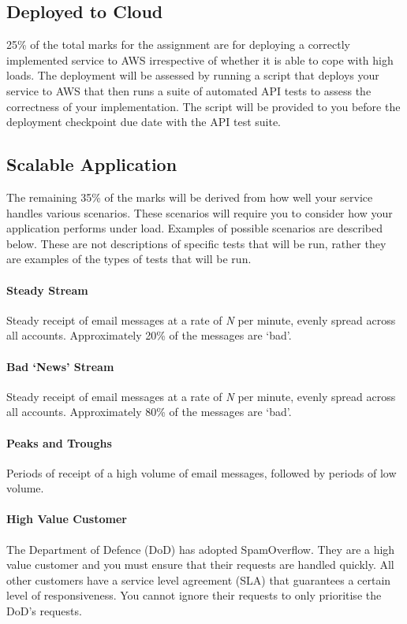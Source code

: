 \documentclass{csse4400}
\begin{document}
\subsection{Deployed to Cloud} %
25\% of the total marks for the assignment are for deploying a correctly implemented service to AWS irrespective of whether it is able to cope with high loads. The deployment will be assessed by running a script that deploys your service to AWS that then runs a suite of automated API tests to assess the correctness of your implementation. The script will be provided to you before the deployment checkpoint due date with the API test suite.

\subsection{Scalable Application}\label{sec:scenarios} %
The remaining 35\% of the marks will be derived from how well your service handles various scenarios. These scenarios will require you to consider how your application performs under load. Examples of possible scenarios are described below. These are not descriptions of specific tests that will be run, rather they are examples of the types of tests that will be run.

\paragraph{Steady Stream}
Steady receipt of email messages at a rate of \emph{N} per minute, evenly spread across all accounts. Approximately 20\% of the messages are `bad'.

\paragraph{Bad `News' Stream}
Steady receipt of email messages at a rate of \emph{N} per minute, evenly spread across all accounts. Approximately 80\% of the messages are `bad'.

\paragraph{Peaks and Troughs}
Periods of receipt of a high volume of email messages, followed by periods of low volume.

\paragraph{High Value Customer}
The Department of Defence (DoD) has adopted SpamOverflow.
They are a high value customer and you must ensure that their requests are handled quickly.
All other customers have a service level agreement (SLA) that guarantees a certain level of responsiveness.
You cannot ignore their requests to only prioritise the DoD's requests.
\end{document}
